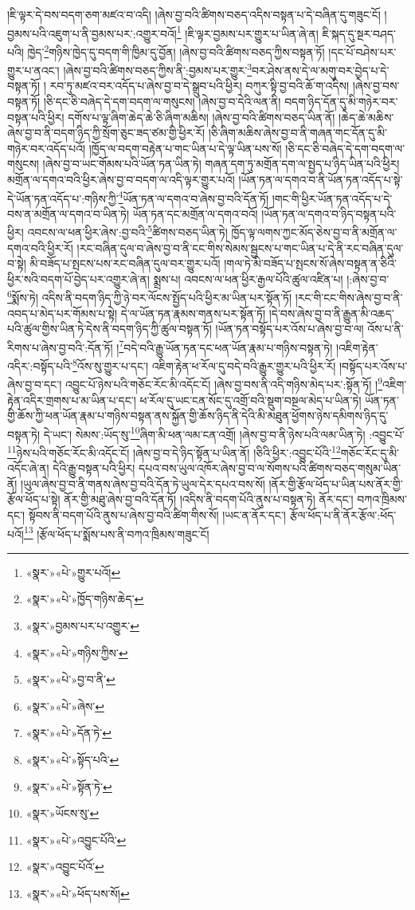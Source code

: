 །ཇི་ལྟར་དེ་བས་བདག་ཅག་མཛའ་བ་འདི། །ཞེས་བྱ་བའི་ཚིགས་བཅད་འདིས་བསྟན་པ་དེ་བཞིན་དུ་གཟུང་ངོ། །བྱམས་པའི་འཇུག་པ་ནི་བྱམས་པར་:འགྱུར་བའོ།\footnote{«སྣར་»«པེ་»གྱུར་པའོ།} །ཇི་ལྟར་བྱམས་པར་གྱུར་པ་ཡིན་ཞེ་ན། ཇི་སྐད་དུ་སྔར་བཤད་པའི། ཁྱེད་\footnote{«སྣར་»«པེ་»ཁྱོད་གཉིས་ཆེད་}གཉིས་ཁྱེད་དུ་བདག་གི་ཁྱིམ་དུ་བྱོན། །ཞེས་བྱ་བའི་ཚིགས་བཅད་ཀྱིས་བསྟན་ཏོ། །དང་པོ་བཤེས་པར་གྱུར་པ་ནའང་། །ཞེས་བྱ་བའི་ཚིགས་བཅད་ཀྱིས་ནི་:བྱམས་པར་གྱུར་\footnote{«སྣར་»བྱམས་པར་པ་འགྱུར་}བར་ཤེས་ནས་དེ་ལ་མགུ་བར་བྱེད་པ་དེ་བསྟན་ཏོ། །
རབ་ཏུ་མཛའ་བར་འདོད་པ་ཞེས་བྱ་བ་དེ་སྒྲུབ་པའི་ཕྱིར། བཀུར་སྟི་བྱ་བའི་ཆོ་ག་འདིས། །ཞེས་བྱ་བས་བསྟན་ཏོ། །ཅི་དང་ཅི་བཞེད་དེ་དག་བདག་ལ་གསུངས། །ཞེས་བྱ་བ་དེའི་ལན་ནི། བདག་ཉིད་དོན་དུ་མི་གཉེར་བར་བསྟན་པའི་ཕྱིར། དགོས་པ་ལྟ་ཞིག་ཆེད་ཆེ་ཅི་ཞིག་མཆིས། །ཞེས་བྱ་བའི་ཚིགས་བཅད་ཡིན་ནོ། །ཆེད་ཆེ་མཆིས་ཞེས་བྱ་བ་ནི་བདག་ཉིད་ཀྱི་སྲོག་ཅུང་ཟད་ཙམ་གྱི་ཕྱིར་རོ། །ཅི་ཞིག་མཆིས་ཞེས་བྱ་བ་ནི་གཞན་གང་དོན་དུ་མི་གཉེར་བར་འདོད་པའོ། །ཁྱོད་ལ་བདག་བརྟེན་པ་གང་ཡིན་པ་དེ་ལྟ་ཡིན་པས་སོ། །ཅི་དང་ཅི་བཞེད་དེ་དག་བདག་ལ་གསུངས། །ཞེས་བྱ་བ་ཡང་གོམས་པའི་ཡོན་ཏན་ཡིན་ཏེ། གཞན་དག་ཏུ་མགྲོན་དག་ལ་སྤྱད་པ་ཉིད་ཡིན་པའི་ཕྱིར། མགྲོན་ལ་དགའ་བའི་ཕྱིར་ཞེས་བྱ་བ་བདག་ལ་འདི་ལྟར་གྱུར་པའོ། །ཡོན་ཏན་ལ་དགའ་བ་ནི་ཡོན་ཏན་འདོད་པ་སྟེ་དེ་ཡོན་ཏན་འདོད་པ་:གཉིས་ཀྱི་\footnote{«སྣར་»«པེ་»གཉིས་ཀྱིས་}ཡོན་ཏན་ལ་དགའ་བ་ཞེས་བྱ་བའི་དོན་ཏོ། །གང་གི་ཕྱིར་ཡོན་ཏན་འདོད་པ་དེ་བས་ན་མགྲོན་ལ་དགའ་བ་ཡིན་ཏེ། ཡོན་ཏན་དང་མགྲོན་ལ་དགའ་བའོ། །ཡོན་ཏན་ལ་དགའ་བ་ཉིད་བསྟན་པའི་ཕྱིར། འབངས་ལ་ཕན་ཕྱིར་ཞེས་:བྱ་བའི་\footnote{«སྣར་»«པེ་»བྱ་བ་ནི་}ཚིགས་བཅད་ཡིན་ཏེ། ཁྱོད་ལྟ་ལགས་ཀྱང་མོད་ཅེས་བྱ་བ་ནི་མགྲོན་ལ་དགའ་བའི་ཕྱིར་རོ། །རང་བཞིན་དུལ་བ་ཞེས་བྱ་བ་ནི་ངང་གིས་སེམས་སྦྱངས་པ་གང་ཡིན་པ་དེ་ནི་རང་བཞིན་དུལ་བ་སྟེ། མི་བཟོད་པ་སྤངས་པས་རང་བཞིན་དུལ་བར་གྱུར་པའོ། །གལ་ཏེ་མི་བཟོད་པ་སྤངས་སོ་ཞེས་བསྟན་ན་ཅིའི་ཕྱིར་སའི་བདག་པོ་བྱེད་པར་འགྱུར་ཞེ་ན། སྨྲས་པ། འབངས་ལ་ཕན་ཕྱིར་རྒྱལ་པོའི་ཚུལ་འཛིན་པ། །:ཞེས་བྱ་བ་\footnote{«སྣར་»«པེ་»ཞེས་}སྨོས་ཏེ། འདིས་ནི་བདག་ཉིད་ཀྱི་ཉེ་བར་ལོངས་སྤྱོད་པའི་ཕྱིར་མ་ཡིན་པར་སྟོན་ཏོ། །རང་གི་ངང་གིས་ཞེས་བྱ་བ་ནི་འབད་པ་མེད་པར་གོམས་པ་སྟེ། དེ་ལ་ཡོན་ཏན་རྣམས་གནས་པར་སྟོན་ཏོ། །དེ་བས་ཞེས་བྱ་བ་ནི་རྒྱུན་མི་འཆད་པའི་ཚུལ་གྱིས་ཡིན་ཏེ་དེས་ནི་བདག་ཉིད་ཀྱི་ཚུལ་བསྟན་ཏོ། །ཡོན་ཏན་བསྟོད་པར་འོས་པ་ཞེས་བྱ་བ་ལ། འོས་པ་ནི་རིགས་པ་ཞེས་བྱ་བའི་:དོན་ཏོ། །\footnote{«སྣར་»«པེ་»དོན་ཏེ་}བདེ་བའི་རྒྱུ་ཡོན་ཏན་དང་ཕན་ཡོན་རྣམ་པ་གཉིས་བསྟན་ཏེ། །འཇིག་རྟེན་འདིར་:བསྟོད་པའི་\footnote{«སྣར་»«པེ་»སྟོད་པའི་}འོས་སུ་གྱུར་པ་དང་། འཇིག་རྟེན་ཕ་རོལ་དུ་བདེ་བའི་རྒྱུར་གྱུར་པའི་ཕྱིར་རོ། །བསྟོད་པར་འོས་པ་ཞེས་བྱ་བ་དང་། འབྱུང་པོ་ཉེས་པའི་གཅོང་རོང་མི་འདོང་ངོ། །ཞེས་བྱ་བས་ནི་འདི་གཉིས་མེད་པར་:སྟོན་ཏོ། །\footnote{«སྣར་»«པེ་»སྟོན་ཏེ་}འཇིག་རྟེན་འདིར་གྲགས་པ་མ་ཡིན་པ་དང་། ཕ་རོལ་དུ་ཡང་ངན་སོང་དུ་འགྲོ་བའི་སྡུག་བསྔལ་མེད་པ་ཡིན་ཏེ། ཡོན་ཏན་གྱི་ཆོས་ཀྱི་ཕན་ཡོན་རྣམ་པ་གཉིས་བསྟན་ནས་སྐྱོན་གྱི་ཆོས་ཉིད་ནི་དེའི་མི་མཐུན་ཕྱོགས་ཉེས་དམིགས་ཉིད་དུ་བསྟན་ཏེ། དེ་ཡང་། སེམས་:ཡོད་སུ་\footnote{«སྣར་»ཡོངས་སུ་}ཞིག་མི་ཕན་ལམ་ངན་འགྲོ། །ཞེས་བྱ་བ་ནི་ཉེས་པའི་ལམ་ཡིན་ཏེ། :འབྱུང་པོ་\footnote{«སྣར་»«པེ་»འབྱུང་པོའི་}ཉེས་པའི་གཅོང་རོང་མི་འདོང་ངོ། །ཞེས་བྱ་བ་དེ་ཉིད་སྟོན་པ་ཡིན་ནོ། །ཅིའི་ཕྱིར་:འབྱུང་པོའི་\footnote{«སྣར་»འབྱུང་པོའོ་}གཅོང་རོང་དུ་མི་འདོང་ཞེ་ན། དེའི་རྒྱུ་བསྟན་པའི་ཕྱིར། དཔའ་བས་ཡུལ་འཁོར་ཞེས་བྱ་བ་ལ་སོགས་པའི་ཚིགས་བཅད་གསུམ་ཡིན་ནོ། །ཡུལ་ཞེས་བྱ་བ་ནི་གནས་ཞེས་བྱ་བའི་དོན་ཏེ་ཡུལ་དེར་དཔའ་བས་སོ། །ནོར་གྱི་རྩོལ་ཕོད་པ་ཡིན་པས་ནོར་གྱི་རྩོལ་ཕོད་པ་སྟེ། ནོར་གྱི་མཐུ་ཞེས་བྱ་བའི་དོན་ཏོ། །འདིས་ནི་བདག་པོའི་ནུས་པ་བསྟན་ཏེ། ནོར་དང་། བཀའ་ཁྲིམས་དང་། སྟོབས་ནི་བདག་པོའི་ནུས་པ་ཞེས་བྱ་བའི་ཚིག་གིས་སོ། །ཡང་ན་ནོར་དང་། རྩོལ་ཕོད་པ་ནི་ནོར་རྩོལ་:ཕོད་པའོ།\footnote{«སྣར་»«པེ་»ཕོད་པས་སོ།} །རྩོལ་ཕོད་པ་སྨོས་པས་ནི་བཀའ་ཁྲིམས་གཟུང་ངོ། 